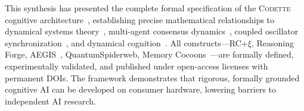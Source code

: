 \documentclass[conference]{IEEEtran}
\newcommand{\codette}{\textsc{Codette}}
\begin{document}
This synthesis has presented the complete formal specification of the \codette{} cognitive architecture~\cite{harrison2026codettefull}, establishing precise mathematical relationships to dynamical systems theory~\cite{khalil2002nonlinear,strogatz2015nonlinear}, multi-agent consensus dynamics~\cite{olfatisaber2007consensus,ren2005consensus}, coupled oscillator synchronization~\cite{kuramoto1984chemical,acebron2005kuramoto}, and dynamical cognition~\cite{beer2000dynamical,kelso1995dynamic}. All constructs---RC+$\xi$, Reasoning Forge, AEGIS~\cite{harrison2025aegisnexus}, QuantumSpiderweb, Memory Cocoons~\cite{harrison2025dreamcore}---are formally defined, experimentally validated, and published under open-access licenses with permanent DOIs. The framework demonstrates that rigorous, formally grounded cognitive AI can be developed on consumer hardware, lowering barriers to independent AI research.



\end{document}
